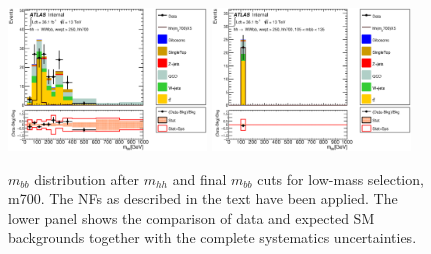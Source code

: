 \begin{figure}[!h]
\begin{center}
\includegraphics*[width=0.47\textwidth] {figures/Unblinded_mbb/C_reOpt700_mww_bbpt210_wwpt250_hh700_bbMass_regionA_met25d020.eps}
\includegraphics*[width=0.47\textwidth] {figures/Unblinded_mbb/C_reOpt700_mww_bbpt210_wwpt250_hh700_mbb_bbMass_regionA_met25d020.eps}
\caption[$m_{bb}$ distribution after $m_{hh}$ and final $m_{bb}$ cuts for low-mass selection, m700.]{$m_{bb}$ distribution after $m_{hh}$ and final $m_{bb}$ cuts for low-mass selection, m700. The NFs as described in the text have been applied. The lower panel shows the comparison of data and expected SM backgrounds together with the complete systematics uncertainties.}
\end{center}
\end{figure}

